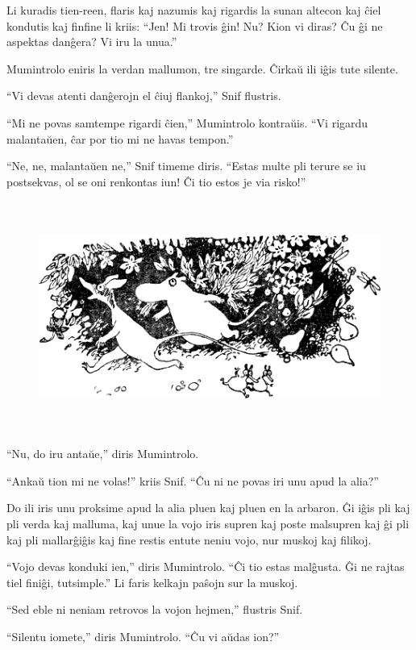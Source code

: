 Li kuradis tien-reen, flaris kaj nazumis kaj rigardis la sunan altecon kaj ĉiel kondutis kaj finfine li kriis: ``Jen! Mi trovis ĝin! Nu? Kion vi diras? Ĉu ĝi ne aspektas danĝera? Vi iru la unua.''

Mumintrolo eniris la verdan mallumon, tre singarde. Ĉirkaŭ ili iĝis tute silente.

``Vi devas atenti danĝerojn el ĉiuj flankoj,'' Snif flustris.

``Mi ne povas samtempe rigardi ĉien,'' Mumintrolo kontraŭis. ``Vi rigardu malantaŭen, ĉar por tio mi ne havas tempon.''

``Ne, ne, malantaŭen ne,'' Snif timeme diris. ``Estas multe pli terure se iu postsekvas, ol se oni renkontas iun! Ĉi tio estos je via risko!''

\begin{figure}[htbp]
\centering
\includegraphics[width=450pt,height=214pt]{1-3.png}
\caption{}
\label{1-3}
\end{figure}

``Nu, do iru antaŭe,'' diris Mumintrolo.

``Ankaŭ tion mi ne volas!'' kriis Snif. ``Ĉu ni ne povas iri unu apud la alia?''

Do ili iris unu proksime apud la alia pluen kaj pluen en la arbaron. Ĝi iĝis pli kaj pli verda kaj malluma, kaj unue la vojo iris supren kaj poste malsupren kaj ĝi pli kaj pli mallarĝiĝis kaj fine restis entute neniu vojo, nur muskoj kaj filikoj.

``Vojo devas konduki ien,'' diris Mumintrolo. ``Ĉi tio estas malĝusta. Ĝi ne rajtas tiel finiĝi, tutsimple.'' Li faris kelkajn paŝojn sur la muskoj.

``Sed eble ni neniam retrovos la vojon hejmen,'' flustris Snif.

``Silentu iomete,'' diris Mumintrolo. ``Ĉu vi aŭdas ion?''

